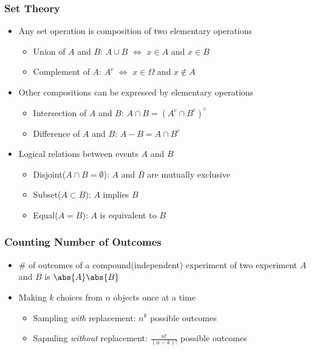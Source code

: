 \subsubsection*{Set Theory}
\begin{itemize}
    \item Any set operation is composition of two elementary operations
    \begin{itemize}
        \item Union of $A$ and $B$: $A\cup B$ $\iff$ $x\in A$ and $x\in B$
        \item Complement of $A$: $A^c$ $\iff$ $x\in\Omega$ and $x\notin A$
    \end{itemize}
    \item Other compositions can be expressed by elementary operations
    \begin{itemize}
        \item Intersection of $A$ and $B$: $A\cap B=(A^c\cap B^c)^c$
        \item Difference of $A$ and $B$: $A-B=A\cap B^c$
    \end{itemize}
    \item Logical relations between events $A$ and $B$
    \begin{itemize}
        \item Disjoint($A\cap B=\emptyset$): $A$ and $B$ are mutually exclusive
        \item Subset($A\subset B$): $A$ implies $B$
        \item Equal($A=B$): $A$ is equivalent to $B$
    \end{itemize}
\end{itemize}

\subsubsection*{Counting Number of Outcomes}
\begin{itemize}
    \item \# of outcomes of a compound(independent) experiment of two experiment $A$ and $B$ is $\abs{A}\abs{B}$
    \item Making $k$ choices from $n$ objects once at a time
    \begin{itemize}
        \item Sampling \textit{with} replacement: $n^k$ possible outcomes
        \item Sapmling \textit{without} replacement: $\frac{n!}{(n-k)!}$ possible outcomes
    \end{itemize}
\end{itemize}
\clearpage

